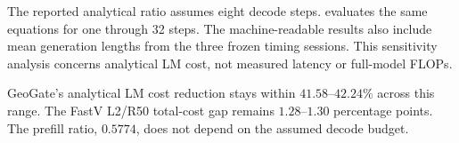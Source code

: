 The reported analytical ratio assumes eight decode steps.  evaluates the same equations for one through 32 steps. The machine-readable results also include mean generation lengths from the three frozen timing sessions. This sensitivity analysis concerns analytical LM cost, not measured latency or full-model FLOPs.

\begin{table}[t]
\centering
\caption{Analytical LM cost ratios across decode lengths.}
\label{tab:supp_cost_sensitivity}
\end{table}

GeoGate's analytical LM cost reduction stays within $41.58$--$42.24\%$ across this range. The FastV L2/R50 total-cost gap remains $1.28$--$1.30$ percentage points. The prefill ratio, $0.5774$, does not depend on the assumed decode budget.
